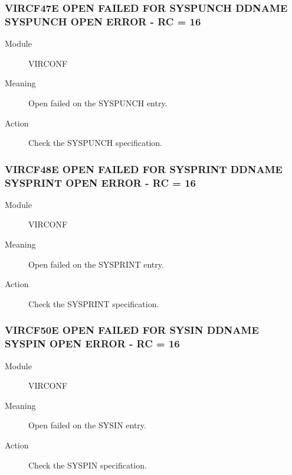 \documentclass[letterpaper,10pt,english]{sphinxmanual}
\begin{document}
\subsubsection{VIRCF47E OPEN FAILED FOR SYSPUNCH DDNAME SYSPUNCH OPEN ERROR - RC = 16}
\label{\detokenize{messages:vircf47e-open-failed-for-syspunch-ddname-syspunch-open-error-rc-16}}\begin{description}
\item[{Module}] \leavevmode
VIRCONF

\item[{Meaning}] \leavevmode
Open failed on the SYSPUNCH entry.

\item[{Action}] \leavevmode
Check the SYSPUNCH specification.

\end{description}


\subsubsection{VIRCF48E OPEN FAILED FOR SYSPRINT DDNAME SYSPRINT OPEN ERROR - RC = 16}
\label{\detokenize{messages:vircf48e-open-failed-for-sysprint-ddname-sysprint-open-error-rc-16}}\begin{description}
\item[{Module}] \leavevmode
VIRCONF

\item[{Meaning}] \leavevmode
Open failed on the SYSPRINT entry.

\item[{Action}] \leavevmode
Check the SYSPRINT specification.

\end{description}


\subsubsection{VIRCF50E OPEN FAILED FOR SYSIN DDNAME SYSPIN OPEN ERROR - RC = 16}
\label{\detokenize{messages:vircf50e-open-failed-for-sysin-ddname-syspin-open-error-rc-16}}\begin{description}
\item[{Module}] \leavevmode
VIRCONF

\item[{Meaning}] \leavevmode
Open failed on the SYSIN entry.

\item[{Action}] \leavevmode
Check the SYSPIN specification.

\end{description}
\end{document}
